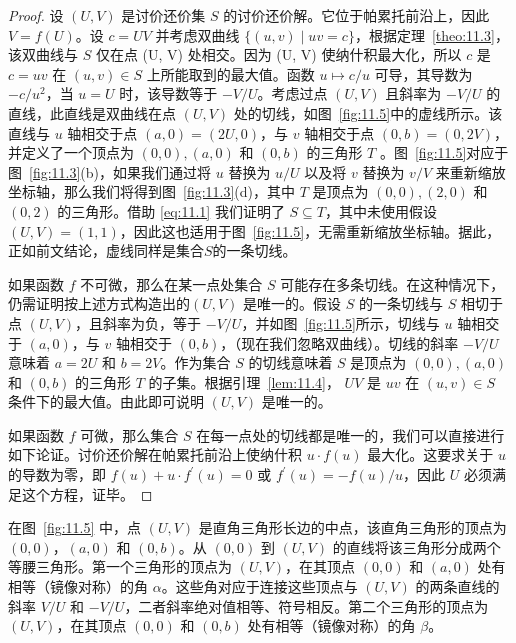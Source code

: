 \begin{proof}
设 $(U,V)$ 是讨价还价集 \(S\) 的讨价还价解。它位于帕累托前沿上，因此 \(V = f\left( U\right)\)。设 \(c = {UV}\) 并考虑双曲线 \(\{ \left( {u,v}\right)  \mid  {uv} = c\}\)，根据定理~\ref{theo:11.3}，该双曲线与 \(S\) 仅在点 (U, V) 处相交。因为 (U, V) 使纳什积最大化，所以 \(c\) 是 \(c = {uv}\) 在 \(\left( {u,v}\right)  \in  S\) 上所能取到的最大值。函数 \(u \mapsto  c/u\) 可导，其导数为 \(- c/{u}^{2}\)，当 \(u = U\) 时，该导数等于 \(- V/U\)。考虑过点 $(U,V)$ 且斜率为 \(- V/U\) 的直线，此直线是双曲线在点 $(U,V)$ 处的切线，如图~\ref{fig:11.5}中的虚线所示。该直线与 \(u\) 轴相交于点 \(\left( {a,0}\right)  = \left( {{2U},0}\right)\)，与 \(v\) 轴相交于点 \(\left( {0,b}\right)  = \left( {0,{2V}}\right)\)，并定义了一个顶点为 \(\left( {0,0}\right),\left( {a,0}\right)\) 和 $(0,b)$ 的三角形 \(T\) 。图~\ref{fig:11.5}对应于图~\ref{fig:11.3}(b)，如果我们通过将 \(u\) 替换为 \(u/U\) 以及将 \(v\) 替换为 \(v/V\) 来重新缩放坐标轴，那么我们将得到图~\ref{fig:11.3}(d)，其中 \(T\) 是顶点为 \(\left( {0,0}\right),\left( {2,0}\right)\) 和 \(\left(0,2\right)\) 的三角形。借助 \eqref{eq:11.1} 我们证明了 \(S \subseteq  T\)，其中未使用假设 \(\left( {U,V}\right)  = \left( {1,1}\right)\)，因此这也适用于图~\ref{fig:11.5}，无需重新缩放坐标轴。据此，正如前文结论，虚线同样是集合\(S\)的一条切线。

如果函数 \(f\) 不可微，那么在某一点处集合 \(S\) 可能存在多条切线。在这种情况下，仍需证明按上述方式构造出的$(U,V)$ 是唯一的。假设 \(S\) 的一条切线与 \(S\) 相切于点 $(U,V)$，且斜率为负，等于 \(- V/U\)，并如图~\ref{fig:11.5}所示，切线与 \(u\) 轴相交于 $(a,0)$，与 \(v\) 轴相交于 $(0,b)$，（现在我们忽略双曲线）。切线的斜率 \(- V/U\) 意味着 \(a = {2U}\) 和 \(b = {2V}\)。作为集合 \(S\) 的切线意味着 \(S\) 是顶点为 \(\left( {0,0}\right),\left( {a,0}\right)\) 和 $(0,b)$ 的三角形 \(T\) 的子集。根据引理~\ref{lem:11.4}， \({UV}\) 是 \({uv}\) 在 \(\left( {u,v}\right)  \in  S\) 条件下的最大值。由此即可说明 $(U,V)$ 是唯一的。

如果函数 \(f\) 可微，那么集合 \(S\) 在每一点处的切线都是唯一的，我们可以直接进行如下论证。讨价还价解在帕累托前沿上使纳什积 \(u \cdot  f\left( u\right)\) 最大化。这要求关于 \(u\) 的导数为零，即 \(f\left( u\right)  + u \cdot  {f}^{\prime }\left( u\right)  = 0\) 或 \({f}^{\prime }\left( u\right)  =  - f\left( u\right) /u\)，因此 \(U\) 必须满足这个方程，证毕。
\end{proof}

在图~\ref{fig:11.5} 中，点 $(U,V)$ 是直角三角形长边的中点，该直角三角形的顶点为 $(0,0)$，$(a,0)$ 和 $(0,b)$。从 $(0,0)$ 到 $(U,V)$ 的直线将该三角形分成两个等腰三角形。第一个三角形的顶点为 $(U,V)$，在其顶点 $(0,0)$ 和 $(a,0)$ 处有相等（镜像对称）的角 \(\alpha\)。这些角对应于连接这些顶点与 $(U,V)$ 的两条直线的斜率 \(V/U\) 和 \(- V/U\)，二者斜率绝对值相等、符号相反。第二个三角形的顶点为 $(U,V)$，在其顶点 $(0,0)$ 和 $(0,b)$ 处有相等（镜像对称）的角 \(\beta\)。

